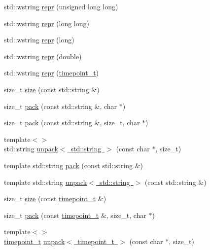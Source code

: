 \begin{DoxyCompactItemize}
\item 
std\+::wstring \mbox{\hyperlink{namespaceebml_a82cacdcda15dab54cb129baca549eb2f}{repr}} (unsigned long long)
\item 
std\+::wstring \mbox{\hyperlink{namespaceebml_ae628d127f38ecd31687f54becab12c27}{repr}} (long long)
\item 
std\+::wstring \mbox{\hyperlink{namespaceebml_ace4ca5a87203afac26054d724b9be07d}{repr}} (long)
\item 
std\+::wstring \mbox{\hyperlink{namespaceebml_a2798ab93b716158ab4c4e796f7c9c97c}{repr}} (double)
\item 
std\+::wstring \mbox{\hyperlink{namespaceebml_a92c6b0cf4a3eef6a4b48746c0e43a3c1}{repr}} (\mbox{\hyperlink{namespaceebml_a7e667ec3fe8b51fb5b8f9690734d8638}{timepoint\+\_\+t}})
\item 
size\+\_\+t \mbox{\hyperlink{namespaceebml_a75eaf24de9c90584c60e27de3b1dd63e}{size}} (const std\+::string \&)
\item 
size\+\_\+t \mbox{\hyperlink{namespaceebml_a2ee8aa5ba5754b7c9e63da8fce0e413b}{pack}} (const std\+::string \&, char $\ast$)
\item 
size\+\_\+t \mbox{\hyperlink{namespaceebml_a436b47856669dd55e115bb9144e4e543}{pack}} (const std\+::string \&, size\+\_\+t, char $\ast$)
\item 
{\footnotesize template$<$$>$ }\\std\+::string \mbox{\hyperlink{namespaceebml_ad8250743a22e62d2cdee2b695870398e}{unpack$<$ std\+::string $>$}} (const char $\ast$, size\+\_\+t)
\item 
template std\+::string \mbox{\hyperlink{namespaceebml_a12db4cd27f116243759ded7e321b0a45}{pack}} (const std\+::string \&)
\item 
template std\+::string \mbox{\hyperlink{namespaceebml_a59216a04daa34cd404bdd97600ab1fe1}{unpack$<$ std\+::string $>$}} (const std\+::string \&)
\item 
size\+\_\+t \mbox{\hyperlink{namespaceebml_a95bc53481ddec59de86aa1ab7f8aae88}{size}} (const \mbox{\hyperlink{namespaceebml_a7e667ec3fe8b51fb5b8f9690734d8638}{timepoint\+\_\+t}} \&)
\item 
size\+\_\+t \mbox{\hyperlink{namespaceebml_a1878818f2cc11ea62ecab6513bc7e9d1}{pack}} (const \mbox{\hyperlink{namespaceebml_a7e667ec3fe8b51fb5b8f9690734d8638}{timepoint\+\_\+t}} \&, size\+\_\+t, char $\ast$)
\item 
{\footnotesize template$<$$>$ }\\\mbox{\hyperlink{namespaceebml_a7e667ec3fe8b51fb5b8f9690734d8638}{timepoint\+\_\+t}} \mbox{\hyperlink{namespaceebml_a939a46f36f4c7e9eaf14bc0ea612256c}{unpack$<$ timepoint\+\_\+t $>$}} (const char $\ast$, size\+\_\+t)

\end{DoxyCompactItemize}
